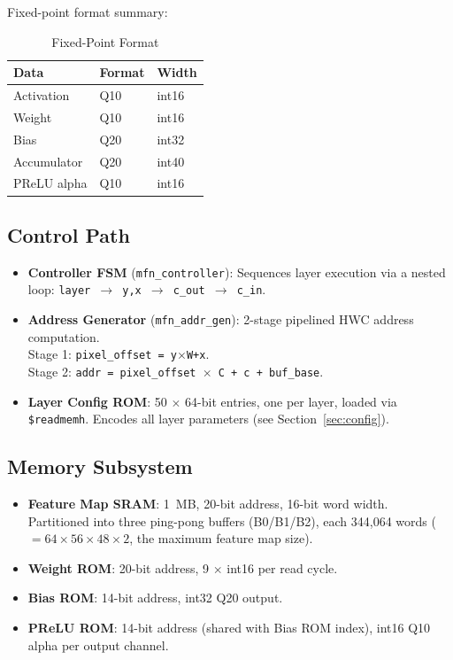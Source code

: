 Fixed-point format summary:
 
\begin{table}[H]
\centering
\caption{Fixed-Point Format}
\begin{tabular}{lll}
\toprule
\textbf{Data} & \textbf{Format} & \textbf{Width} \\
\midrule
Activation   & Q10 & int16 \\
Weight       & Q10 & int16 \\
Bias         & Q20 & int32 \\
Accumulator  & Q20 & int40 \\
PReLU alpha  & Q10 & int16 \\
\bottomrule
\end{tabular}
\end{table}
 
\subsection{Control Path}
 
\begin{itemize}[nosep]
  \item \textbf{Controller FSM} (\texttt{mfn\_controller}): Sequences layer
        execution via a nested loop: \texttt{layer $\rightarrow$ y,x $\rightarrow$ c\_out $\rightarrow$ c\_in}.
  \item \textbf{Address Generator} (\texttt{mfn\_addr\_gen}): 2-stage pipelined
        HWC address computation. \\
        Stage 1: \texttt{pixel\_offset = y$\times$W+x}.\\
        Stage 2: \texttt{addr = pixel\_offset $\times$ C + c + buf\_base}.
  \item \textbf{Layer Config ROM}: 50 $\times$ 64-bit entries, one per layer, loaded via \texttt{\$readmemh}. Encodes all layer parameters
        (see Section~\ref{sec:config}).
\end{itemize}
 
\subsection{Memory Subsystem}
 
\begin{itemize}[nosep]
  \item \textbf{Feature Map SRAM}: 1~MB, 20-bit address, 16-bit word width. Partitioned into three ping-pong buffers (B0/B1/B2), each 344,064 words ($= 64 \times 56 \times 48 \times 2$, the maximum feature map size).
  \item \textbf{Weight ROM}: 20-bit address, 9 $\times$ int16 per read cycle.
  \item \textbf{Bias ROM}: 14-bit address, int32 Q20 output.
  \item \textbf{PReLU ROM}: 14-bit address (shared with Bias ROM index), int16 Q10 alpha per output channel.
\end{itemize}
 
